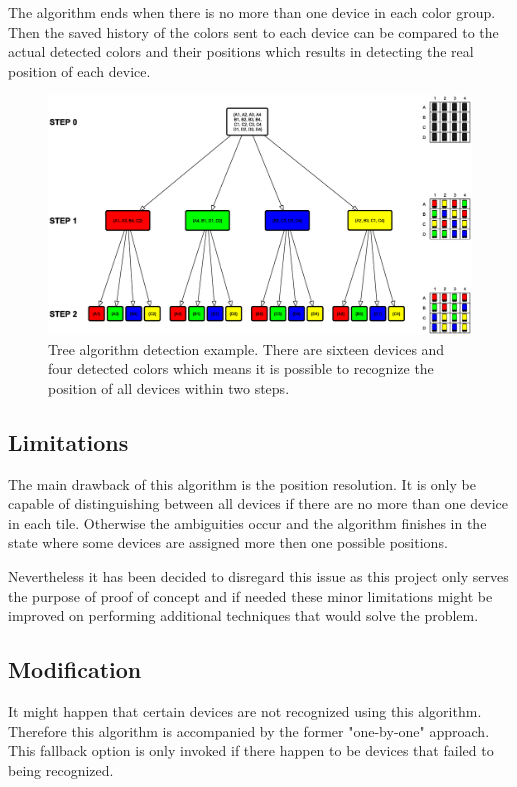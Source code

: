 The algorithm ends when there is no more than one device in each color group. Then the saved history of the colors sent to each device can be compared to the actual detected colors and their positions which results in detecting the real position of each device.

\begin{figure}[H]
	\centering
		\includegraphics[width=18cm, angle=90]{sprint5/tree_algorithm.eps}
	\caption[Tree algorithm detection example]{Tree algorithm detection example. There are sixteen devices and four detected colors which means it is possible to recognize the position of all devices within two steps.}
	\label{fig:sprint5_tree_alg}
\end{figure}

\subsection{Limitations}
The main drawback of this algorithm is the position resolution. It is only be capable of distinguishing between all devices if there are no more than one device in each tile. Otherwise the ambiguities occur and the algorithm finishes in the state where some devices are assigned more then one possible positions.

Nevertheless it has been decided to disregard this issue as this project only serves the purpose of proof of concept and if needed these minor limitations might be improved on performing additional techniques that would solve the problem.

\subsection{Modification}
It might happen that certain devices are not recognized using this algorithm. Therefore this algorithm is accompanied by the former "one-by-one" approach. This fallback option is only invoked if there happen to be devices that failed to being recognized.

